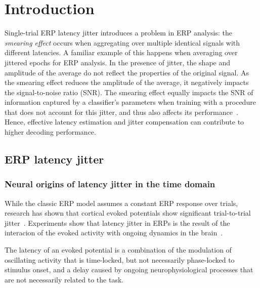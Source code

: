 \section{Introduction}

Single-trial ERP latency jitter introduces a problem in ERP analysis:
the \textit{smearing effect} occurs when aggregating over multiple identical
signals with different latencies.
A familiar example of this happens when averaging over jittered epochs for ERP
analysis.
In the presence of jitter, the shape and amplitude of the average do not
reflect the properties of the original signal.
As the smearing effect reduces the amplitude of the average,
it negatively impacts the signal-to-noise ratio (SNR).
The smearing effect equally impacts the SNR of information captured by a
classifier's parameters when training with a procedure that does not account for
this jitter, and thus also affects its performance~\cite{Thompson2012}.
Hence, effective latency estimation and jitter compensation can contribute to higher
decoding performance.


\subsection{ERP latency jitter}

\subsubsection{Neural origins of latency jitter in the time domain}
While the classic ERP model assumes a constant ERP response over trials,
research has shown that cortical evoked potentials show significant
trial-to-trial jitter~\cite{truccolo2002trial}.
Experiments show that latency jitter in ERPs is the result of the interacion of
the evoked activity with ongoing dynamics in the brain~\cite{Hasenstaub2007,
	kisley1999trial, Curto2009, Arieli1996}.

The latency of an evoked potential is a combination of the modulation of oscillating activity that is
time-locked, but not necessarily phase-locked to stimulus onset, and a
delay caused by ongoing neurophysiological processes that are not necessarily related to the task.

